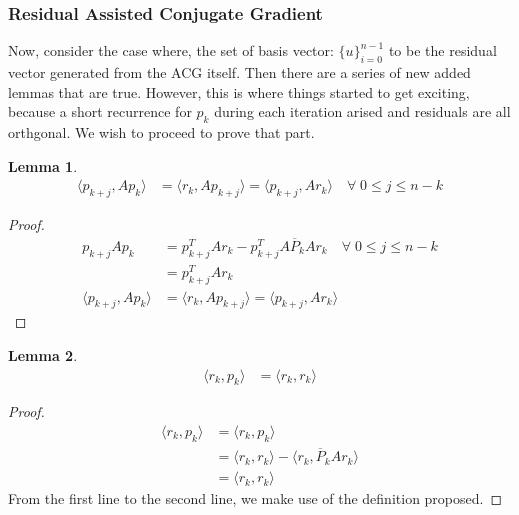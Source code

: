 \documentclass[]{article}
\theoremstyle{definition}
\newtheorem{lemma}{Lemma}[subsection]    %
\begin{document}
        \subsubsection{Residual Assisted Conjugate Gradient}
            Now, consider the case where, the set of basis vector: $\{u\}_{i = 0}^{n - 1}$ to be the residual vector generated from the ACG itself. Then there are a series of new added lemmas that are true. However, this is where things started to get exciting, because a short recurrence for $p_k$ during each iteration arised and residuals are all orthgonal. We wish to proceed to prove that part. 
            \begin{lemma}\label{lemma:1.5.1}
                \begin{align}
                    \langle p_{k + j}, Ap_k\rangle
                    &=\langle r_k, Ap_{k + j}\rangle
                    = \langle p_{k + j}, Ar_k\rangle \quad \forall\; 0 \le j \le n - k
                \end{align}
            \end{lemma}
            \begin{proof}
                \begin{align}
                    p_{k + j} Ap_k &= p_{k + j}^TAr_k - p_{k + j}^TA\overline{P}_{k}Ar_k \quad 
                    \forall\; 0 \le j \le n - k
                    \\
                    &= p_{k + j}^TAr_k
                    \\
                    \langle p_{k + j}, Ap_k\rangle
                    &= \langle r_k, Ap_{k + j}\rangle
                    = \langle p_{k + j}, Ar_k\rangle
                \end{align}
            \end{proof}
            \begin{lemma}\label{lemma:1.5.2}
                \begin{align}
                    \langle r_k, p_k\rangle &= \langle r_k, r_k\rangle
                \end{align}
            \end{lemma}
            \begin{proof}
                \begin{align}
                    \langle r_k, p_k\rangle &= 
                    \langle r_k, p_k\rangle
                    \\
                    &= \langle r_k, r_k\rangle - \langle r_k, \overline{P}_kAr_k\rangle
                    \\
                    &= \langle r_k, r_k\rangle
                \end{align}
                From the first line to the second line, we make use of the definition proposed. 
            \end{proof}
\end{document}
